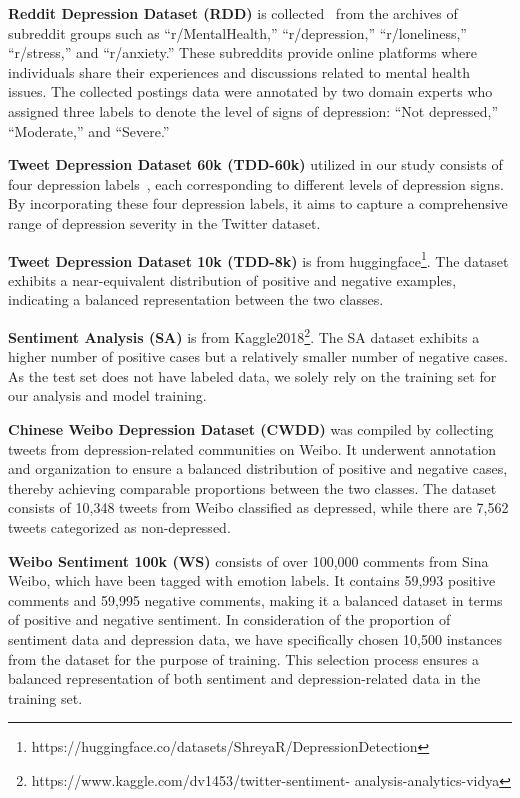 \documentclass[runningheads]{llncs}
\begin{document}
\textbf{Reddit Depression Dataset (RDD)} is collected~\cite{sampath2022data} from the archives of subreddit groups such as ``r/MentalHealth,'' ``r/depression,'' ``r/loneliness,'' ``r/stress,'' and ``r/anxiety.'' These subreddits provide online platforms where individuals share their experiences and discussions related to mental health issues. The collected postings data were annotated by two domain experts who assigned three labels to denote the level of signs of depression: ``Not depressed,'' ``Moderate,'' and ``Severe.'' 

\textbf{Tweet Depression Dataset 60k (TDD-60k)} utilized in our study consists of four depression labels~\cite{tavchioski2023detection}, each corresponding to different levels of depression signs. By incorporating these four depression labels, it aims to capture a comprehensive range of depression severity in the Twitter dataset.

\textbf{Tweet Depression Dataset 10k (TDD-8k)} is from huggingface\footnote{https://huggingface.co/datasets/ShreyaR/DepressionDetection}. The dataset exhibits a near-equivalent distribution of positive and negative examples, indicating a balanced representation between the two classes.

\textbf{Sentiment Analysis (SA)}  is  from Kaggle2018\footnote{https://www.kaggle.com/dv1453/twitter-sentiment-
analysis-analytics-vidya}. The SA dataset exhibits a higher number of positive cases but a relatively smaller number of negative cases. As the test set does not have labeled data, we solely rely on the training set for our analysis and model training.

\textbf{Chinese Weibo Depression Dataset (CWDD)} was compiled by collecting tweets from depression-related communities on Weibo. It underwent annotation and organization to ensure a balanced distribution of positive and negative cases, thereby achieving comparable proportions between the two classes. The dataset consists of 10,348 tweets from Weibo classified as depressed, while there are 7,562 tweets categorized as non-depressed.

\textbf{Weibo Sentiment 100k (WS)} consists of over 100,000 comments from Sina Weibo, which have been tagged with emotion labels. It contains  59,993 positive comments and 59,995 negative comments, making it a balanced dataset in terms of positive and negative sentiment. In consideration of the proportion of sentiment data and depression data, we have specifically chosen 10,500 instances from the dataset for the purpose of training. This selection process ensures a balanced representation of both sentiment and depression-related data in the training set. 
\end{document}
